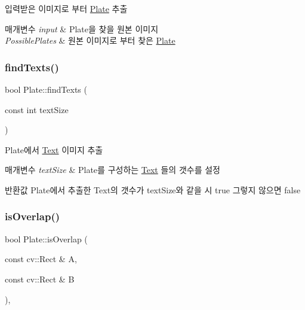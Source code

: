 입력받은 이미지로 부터 \hyperlink{class_plate}{Plate} 추출 


\begin{DoxyParams}{매개변수}
{\em input} & Plate을 찾을 원본 이미지 \\
\hline
{\em Possible\+Plates} & 원본 이미지로 부터 찾은 \hyperlink{class_plate}{Plate} \\
\hline
\end{DoxyParams}
\mbox{\label{class_plate_aa18c9cc52a8a756d019faf82cd93ce13}} 
\subsubsection{\texorpdfstring{find\+Texts()}{findTexts()}}
{\footnotesize\ttfamily bool Plate\+::find\+Texts (\begin{DoxyParamCaption}\item[{const int}]{text\+Size }\end{DoxyParamCaption})}



Plate에서 \hyperlink{class_plate_1_1_text}{Text} 이미지 추출 


\begin{DoxyParams}{매개변수}
{\em text\+Size} & Plate를 구성하는 \hyperlink{class_plate_1_1_text}{Text} 들의 갯수를 설정 \\
\hline
\end{DoxyParams}
\begin{DoxyReturn}{반환값}
Plate에서 추출한 Text의 갯수가 text\+Size와 같을 시 true 그렇지 않으면 false 
\end{DoxyReturn}
\mbox{\label{class_plate_afffe9775bd49995e5ae87f6880af96d4}} 
\subsubsection{\texorpdfstring{is\+Overlap()}{isOverlap()}}
{\footnotesize\ttfamily bool Plate\+::is\+Overlap (\begin{DoxyParamCaption}\item[{const cv\+::\+Rect \&}]{A,  }\item[{const cv\+::\+Rect \&}]{B }\end{DoxyParamCaption})\hspace{0.3cm}{\ttfamily [inline]}, {\ttfamily [private]}}



